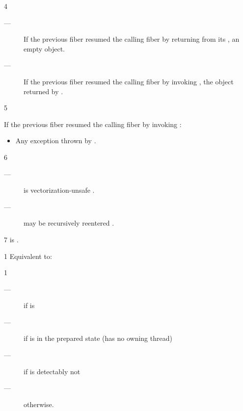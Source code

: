 4 \returns

\begin{description}
    \item[---] If the previous fiber resumed the calling fiber by returning
          from its \entryfn, an empty \fiber object.
    \item[---] If the previous fiber resumed the calling fiber by
          invoking , the \fiber object returned
          by .
\end{description}

5 \except

If the previous fiber resumed the calling fiber by invoking :
\begin{itemize}
    \item Any exception thrown by .
\end{itemize}


6 \remarks

\begin{description}
    \item[---] \resumewith is vectorization-unsafe .
    \item[---] \resumewith may be recursively reentered .
\end{description}

7 \postcond
{} is \true.



1 \effects
Equivalent to:\\


1 \returns
\begin{description}
    \item[---] \false if  is \true
    \item[---] \true if \thisfiber is in the prepared state (has no owning thread)
    \item[---] \false if \currthread is detectably not \ownthread
    \item[---] \true otherwise.
\end{description}

